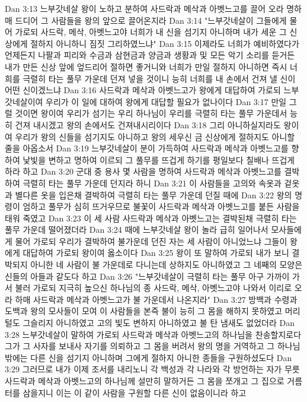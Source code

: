 Dan 3:13  느부갓네살 왕이 노하고 분하여 사드락과 메삭과 아벳느고를 끌어 오라 명하매 드디어 그 사람들을 왕의 앞으로 끌어온지라
Dan 3:14  "느부갓네살이 그들에게 물어 가로되 사드락, 메삭, 아벳느고야 너희가 내 신을 섬기지 아니하며 내가 세운 그 신상에게 절하지 아니하니 짐짓 그리하였느냐"
Dan 3:15  이제라도 너희가 예비하였다가 언제든지 나팔과 피리와 수금과 삼현금과 양금과 생황과 및 모든 악기 소리를 듣거든 내가 만든 신상 앞에 엎드리어 절하면 좋거니와 너희가 만일 절하지 아니하면 즉시 너희를 극렬히 타는 풀무 가운데 던져 넣을 것이니 능히 너희를 내 손에서 건져 낼 신이 어떤 신이겠느냐
Dan 3:16  사드락과 메삭과 아벳느고가 왕에게 대답하여 가로되 느부갓네살이여 우리가 이 일에 대하여 왕에게 대답할 필요가 없나이다
Dan 3:17  만일 그럴 것이면 왕이여 우리가 섬기는 우리 하나님이 우리를 극렬히 타는 풀무 가운데서 능히 건져 내시겠고 왕의 손에서도 건져내시리이다
Dan 3:18  그리 아니하실지라도 왕이여 우리가 왕의 신들을 섬기지도 아니하고 왕의 세우신 금 신상에게 절하지도 아니할 줄을 아옵소서
Dan 3:19  느부갓네살이 분이 가득하여 사드락과 메삭과 아벳느고를 향하여 낯빛을 변하고 명하여 이르되 그 풀무를 뜨겁게 하기를 평일보다 칠배나 뜨겁게 하라 하고
Dan 3:20  군대 중 용사 몇 사람을 명하여 사드락과 메삭과 아벳느고를 결박하여 극렬히 타는 풀무 가운데 던지라 하니
Dan 3:21  이 사람들을 고의와 속옷과 겉옷과 별다른 옷을 입은채 결박하여 극렬히 타는 풀무 가운데 던질 때에
Dan 3:22  왕의 명령이 엄하고 풀무가 심히 뜨거우므로 불꽃이 사드락과 메삭과 아벳느고를 붙든 사람을 태워 죽였고
Dan 3:23  이 세 사람 사드락과 메삭과 아벳느고는 결박된채 극렬히 타는 풀무 가운데 떨어졌더라
Dan 3:24  때에 느부갓네살 왕이 놀라 급히 일어나서 모사들에게 물어 가로되 우리가 결박하여 불가운데 던진 자는 세 사람이 아니었느냐 그들이 왕에게 대답하여 가로되 왕이여 옳소이다
Dan 3:25  왕이 또 말하여 가로되 내가 보니 결박되지 아니한 네 사람이 불 가운데로 다니는데 상하지도 아니하였고 그 네째의 모양은 신들의 아들과 같도다 하고
Dan 3:26  "느부갓네살이 극렬히 타는 풀무 아구 가까이 가서 불러 가로되 지극히 높으신 하나님의 종 사드락, 메삭, 아벳느고야 나와서 이리로 오라 하매 사드락과 메삭과 아벳느고가 불 가운데서 나온지라"
Dan 3:27  방백과 수령과 도백과 왕의 모사들이 모여 이 사람들을 본즉 불이 능히 그 몸을 해하지 못하였고 머리털도 그슬리지 아니하였고 고의 빛도 변하지 아니하였고 불 탄 냄새도 없었더라
Dan 3:28  느부갓네살이 말하여 가로되 사드락과 메삭과 아벳느고의 하나님을 찬송할지로다 그가 그 사자를 보내사 자기를 의뢰하고 그 몸을 버려서 왕의 명을 거역하고 그 하나님 밖에는 다른 신을 섬기지 아니하며 그에게 절하지 아니한 종들을 구원하셨도다
Dan 3:29  그러므로 내가 이제 조서를 내리노니 각 백성과 각 나라와 각 방언하는 자가 무릇 사드락과 메삭과 아벳느고의 하나님께 설만히 말하거든 그 몸을 쪼개고 그 집으로 거름터를 삼을지니 이는 이 같이 사람을 구원할 다른 신이 없음이니라 하고
